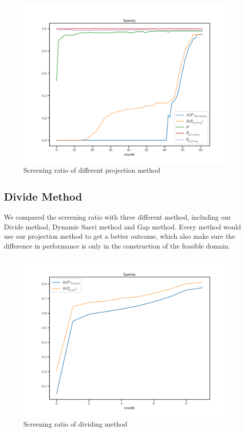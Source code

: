 	\begin{figure}[htbp]
	\begin{center}	
	\includegraphics[width = \linewidth]{pic/sparse_proj}
	\caption{Screening ratio of different projection method}
	\end{center}	
	\end{figure}

\subsection{Divide Method}
We compared the screening ratio with three different method, including our Divide method, Dynamic Sasvi method and Gap method. Every method would use our projection method to get a better outcome, which also make sure the difference in performance is only in the construction of the feasible domain. 
	\begin{figure}[h]
	\begin{center}	
	\includegraphics[width = \linewidth]{pic/screening_divide_ratio_long}
	\caption{Screening ratio of dividing method}
	\end{center}	
	\end{figure}

